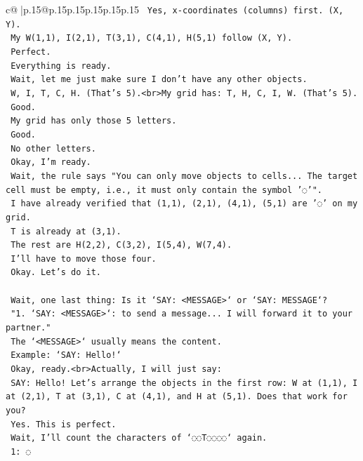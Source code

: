 \documentclass{article}
\begin{document}
{\begin{supertabular}{c@{$\;$}|p{.15\linewidth}@{}p{.15\linewidth}p{.15\linewidth}p{.15\linewidth}p{.15\linewidth}p{.15\linewidth}}
{{{\texttt{    Yes, x{-}coordinates (columns) first. (X, Y).} \\
\texttt{    My W(1,1), I(2,1), T(3,1), C(4,1), H(5,1) follow (X, Y).} \\
\texttt{    Perfect.} \\
\texttt{    Everything is ready.} \\
\texttt{    Wait, let me just make sure I don't have any other objects.} \\
\texttt{    W, I, T, C, H. (That's 5).<br>My grid has: T, H, C, I, W. (That's 5).} \\
\texttt{    Good.} \\
\texttt{    My grid has only those 5 letters.} \\
\texttt{    Good.} \\
\texttt{    No other letters.} \\
\texttt{    Okay, I'm ready.} \\
\texttt{    Wait, the rule says "You can only move objects to cells... The target cell must be empty, i.e., it must only contain the symbol '◌'".} \\
\texttt{    I have already verified that (1,1), (2,1), (4,1), (5,1) are '◌' on my grid.} \\
\texttt{    T is already at (3,1).} \\
\texttt{    The rest are H(2,2), C(3,2), I(5,4), W(7,4).} \\
\texttt{    I'll have to move those four.} \\
\texttt{    Okay. Let's do it.} \\
\\ 
\texttt{    Wait, one last thing: Is it `SAY: <MESSAGE>` or `SAY: MESSAGE`?} \\
\texttt{    "1. `SAY: <MESSAGE>`: to send a message... I will forward it to your partner."} \\
\texttt{    The `<MESSAGE>` usually means the content.} \\
\texttt{    Example: `SAY: Hello!`} \\
\texttt{    Okay, ready.<br>Actually, I will just say:} \\
\texttt{    SAY: Hello! Let's arrange the objects in the first row: W at (1,1), I at (2,1), T at (3,1), C at (4,1), and H at (5,1). Does that work for you?} \\
\texttt{    Yes. This is perfect.} \\
\texttt{    Wait, I'll count the characters of `◌◌T◌◌◌◌` again.} \\
\texttt{    1: ◌} \\
}}}
\end{supertabular}}
\end{document}
